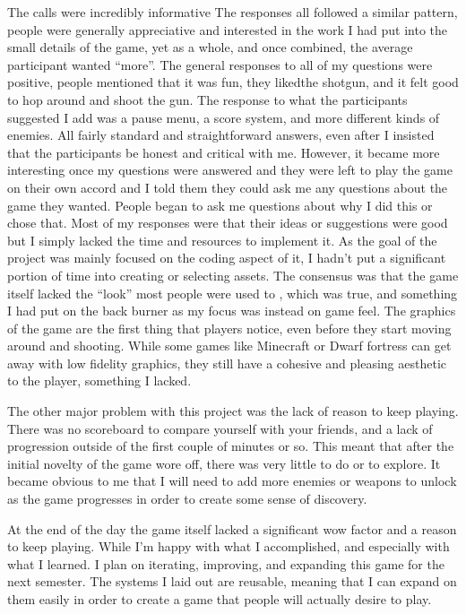\documentclass[10pt,twocolumn]{article}
\begin{document}
The calls were incredibly informative The responses all followed a similar pattern, people were generally appreciative and interested in the work I had put into the small details of the game, yet as a whole, and once combined, the average participant wanted “more”. The general responses to all of my questions were positive, people mentioned that it was fun, they likedthe shotgun, and it felt good to hop around and shoot the gun. The response to what the participants suggested I add was a pause menu, a score system, and more different kinds of enemies. All fairly standard and straightforward answers, even after I insisted that the participants  be honest and critical with me.  However, it became more interesting once my questions were answered and they were left to play the game on their own accord and I told them they could ask me any questions about the game they wanted. People began to ask me questions about why I did this or chose that. Most of my responses were that their ideas or suggestions were good but I simply lacked the time and resources to implement it. As the goal of the project was mainly focused on the coding aspect of it, I hadn’t put a significant portion of time into creating or selecting assets. The consensus was that the game itself lacked the “look” most people were used to , which was true, and something I had put on the back burner as my focus was instead on game feel. The graphics of the game are the first thing that players notice, even before they start moving around and shooting. While some games like Minecraft or Dwarf fortress can get away with low fidelity graphics, they still have a cohesive and pleasing aesthetic to the player, something I lacked. 

The other major problem with this project was the lack of reason to keep playing. There was no scoreboard to compare yourself with your friends, and a lack of progression outside of the first couple of minutes or so. This meant that after the initial novelty of the game wore off, there was very little to do or to explore. It became obvious to me that I will need to add more enemies or weapons to unlock as the game progresses in order to create some sense of discovery. 

At the end of the day the game itself lacked a significant wow factor and a reason to keep playing. While I’m happy with what I accomplished, and especially with what I learned. I plan on iterating, improving, and expanding this game for the next semester. The systems I laid out are reusable, meaning that I can expand on them easily in order to create a game that people will actually desire to play. 
\end{document}
